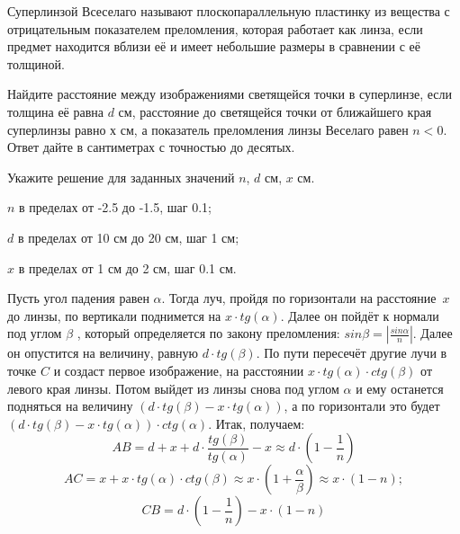 
Суперлинзой Всеселаго называют плоскопараллельную
пластинку из вещества с отрицательным показателем преломления, которая работает
как линза, если предмет находится вблизи её и имеет небольшие размеры в
сравнении с её толщиной.

Найдите расстояние между изображениями светящейся
точки в суперлинзе, если толщина её равна $d$ см, расстояние до светящейся точки  от ближайшего края суперлинзы равно $х$ см, а показатель преломления линзы Веселаго равен $n < 0$. Ответ дайте в сантиметрах с точностью до десятых.

Укажите решение для заданных значений $n$, $d$ см, $x$ см.

\paramSection

$n$ в пределах от -2.5 до -1.5, шаг 0.1;    

$d$ в пределах от 10 см до 20 см, шаг 1 см;  

$x$ в пределах от 1 см до 2 см, шаг 0.1 см.

\solutionSection

Пусть угол падения равен $\alpha$. Тогда луч, пройдя по горизонтали на расстояние~$x$ до линзы, 
по вертикали поднимется на $x \cdot tg(\alpha )$. Далее он пойдёт к нормали под углом  $\beta$ , который 
определяется по закону преломления: $sin\beta =\left|\frac{sin\alpha}{n}\right|$. Далее он опустится на 
величину, равную $d \cdot  tg( \beta )$. По пути пересечёт другие лучи в точке $C$ и создаст первое изображение,  
на расстоянии  $x \cdot tg(\alpha ) \cdot ctg( \beta )$  от левого края линзы. Потом выйдет из линзы снова под 
углом $\alpha$  и ему останется подняться на величину $(d \cdot  tg( \beta ) - x \cdot tg(\alpha ) )$, а по 
горизонтали это будет $(d \cdot  tg( \beta ) - x \cdot tg(\alpha )) \cdot ctg(\alpha )$. Итак, получаем:  
$$AB=d+x+d \cdot \frac{tg( \beta )}{tg(\alpha )}-x \approx d \cdot \left(1-\frac{1}{n}\right)$$
$$AC=x+x \cdot tg(\alpha ) \cdot ctg( \beta ) \approx x \cdot \left(1+\frac{\alpha}{\beta} \right) \approx x \cdot (1-n);$$  
$$CB=d \cdot \left(1-\frac{1}{n}\right)-x \cdot (1-n)$$


